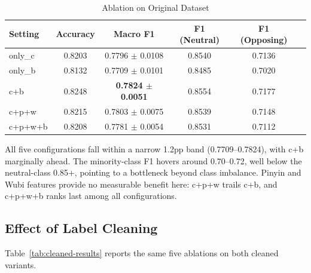 ﻿\documentclass[12pt]{article}
\begin{document}
\begin{table}[htbp]
\centering
\caption{Ablation on Original Dataset}
\label{tab:original-results}
\begin{tabular}{lccccc}
\toprule
Setting & Accuracy & Macro F1 & F1 (Neutral) & F1 (Opposing) \\
\midrule
only\_c   & 0.8203 & 0.7796 $\pm$ 0.0108 & 0.8540 & 0.7136 \\
only\_b   & 0.8132 & 0.7709 $\pm$ 0.0101 & 0.8485 & 0.7020 \\
c+b       & 0.8248 & \textbf{0.7824 $\pm$ 0.0051} & 0.8554 & 0.7177 \\
c+p+w     & 0.8215 & 0.7803 $\pm$ 0.0075 & 0.8539 & 0.7148 \\
c+p+w+b   & 0.8208 & 0.7781 $\pm$ 0.0054 & 0.8531 & 0.7112 \\
\bottomrule
\end{tabular}
\end{table}

All five configurations fall within a narrow 1.2pp band (0.7709--0.7824), with c+b marginally ahead. The minority-class F1 hovers around 0.70--0.72, well below the neutral-class 0.85+, pointing to a bottleneck beyond class imbalance. Pinyin and Wubi features provide no measurable benefit here: c+p+w trails c+b, and c+p+w+b ranks last among all configurations.

\subsection{Effect of Label Cleaning}

Table~\ref{tab:cleaned-results} reports the same five ablations on both cleaned variants.
\end{document}
